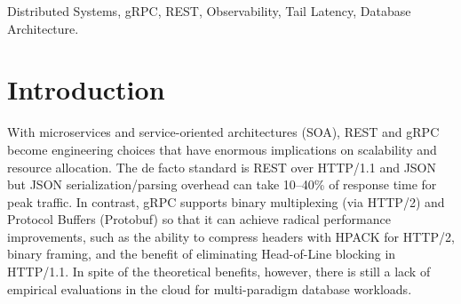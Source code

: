\documentclass[conference]{IEEEtran}
\begin{document}
\maketitle


\begin{abstract}
In this paper, ProtocolShift is introduced as a useful empirical framework to understand REST and gRPC transport overhead over database execution, for a two-node AWS cloud deployment using PostgreSQL, MongoDB and Redis. Benchmarks ignore the database tier and use mean latency, obscuring tail degradation. ProtocolShift tackles this by performing 5 independent trials per configuration with 95\% Student's \textit{t} confidence intervals and Mann--Whitney U testing ($\alpha = 0.01$), in a closed-loop asynchronous load generator with persistent connections. Relative to REST, gRPC is found to be 88--94\% more efficient at reducing the p99 tail latency under high concurrency ($c \ge 50$). Measurement of database execution latency as probed by query-level profiling via pg\_stat\_statements verifies that database execution accounts for less than 0.3\% of end-to-end latency, where transport queuing is the biggest latency factor. These findings are encoded into a three-gate Protocol Migration Threshold with reproducible verdicts of MIGRATE/HOLD for evidence-based protocol adoption.
\end{abstract}

\begin{IEEEkeywords}
Distributed Systems, gRPC, REST, Observability, Tail Latency, Database Architecture.
\end{IEEEkeywords}

\section{Introduction}

With microservices and service-oriented architectures (SOA), REST and gRPC become engineering choices that have enormous implications on scalability and resource allocation. The de facto standard is REST over HTTP/1.1 and JSON \cite{vural2017} but JSON serialization/parsing overhead can take 10--40\% of response time for peak traffic. In contrast, gRPC supports binary multiplexing (via HTTP/2) and Protocol Buffers (Protobuf) so that it can achieve radical performance improvements, such as the ability to compress headers with HPACK for HTTP/2, binary framing, and the benefit of eliminating Head-of-Line blocking in HTTP/1.1. In spite of the theoretical benefits, however, there is still a lack of empirical evaluations in the cloud for multi-paradigm database workloads.
\end{document}
